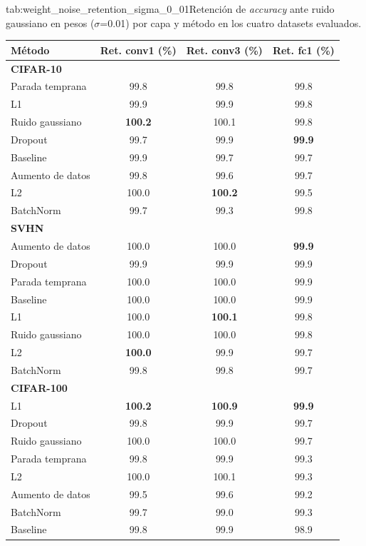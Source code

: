 \begin{table}{tab:weight_noise_retention_sigma_0_01}{Retención de \textit{accuracy} ante ruido gaussiano en pesos ($\sigma$=0.01) por capa y método en los cuatro datasets evaluados.}
\small
\begin{tabular}{lccc}
\toprule
\textbf{Método} & \textbf{Ret. conv1 (\%)} & \textbf{Ret. conv3 (\%)} & \textbf{Ret. fc1 (\%)} \\
\midrule
\multicolumn{4}{l}{\textbf{CIFAR-10}}\\
\midrule
Parada temprana & 99.8 & 99.8 & 99.8 \\
L1 & 99.9 & 99.9 & 99.8 \\
Ruido gaussiano & \textbf{100.2} & 100.1 & 99.8 \\
Dropout & 99.7 & 99.9 & \textbf{99.9} \\
Baseline & 99.9 & 99.7 & 99.7 \\
Aumento de datos & 99.8 & 99.6 & 99.7 \\
L2 & 100.0 & \textbf{100.2} & 99.5 \\
BatchNorm & 99.7 & 99.3 & 99.8 \\
\midrule
\multicolumn{4}{l}{\textbf{SVHN}}\\
\midrule
Aumento de datos & 100.0 & 100.0 & \textbf{99.9} \\
Dropout & 99.9 & 99.9 & 99.9 \\
Parada temprana & 100.0 & 100.0 & 99.9 \\
Baseline & 100.0 & 100.0 & 99.9 \\
L1 & 100.0 & \textbf{100.1} & 99.8 \\
Ruido gaussiano & 100.0 & 100.0 & 99.8 \\
L2 & \textbf{100.0} & 99.9 & 99.7 \\
BatchNorm & 99.8 & 99.8 & 99.7 \\
\midrule
\multicolumn{4}{l}{\textbf{CIFAR-100}}\\
\midrule
L1 & \textbf{100.2} & \textbf{100.9} & \textbf{99.9} \\
Dropout & 99.8 & 99.9 & 99.7 \\
Ruido gaussiano & 100.0 & 100.0 & 99.7 \\
Parada temprana & 99.8 & 99.9 & 99.3 \\
L2 & 100.0 & 100.1 & 99.3 \\
Aumento de datos & 99.5 & 99.6 & 99.2 \\
BatchNorm & 99.7 & 99.0 & 99.3 \\
Baseline & 99.8 & 99.9 & 98.9 \\

\end{tabular}
\end{table}
